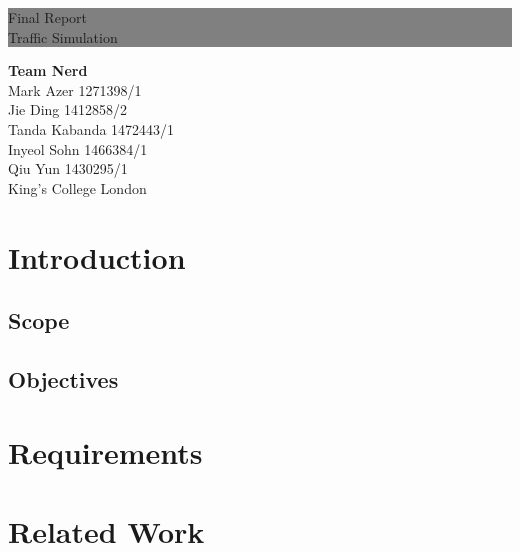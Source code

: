 \documentclass[11pt]{article}
\begin{document}
	\thispagestyle{empty} %

	\colorbox{grey}{
		\parbox[t]{1.0\linewidth}{
			\centering \fontsize{180pt}{40pt}\selectfont %
			\vspace*{0.3cm} %
			
			\hfill Final Report \\
			\hfill Traffic Simulation\par
			
			\vspace*{0.7cm} %
		}
	}
	\vfill %
	{\centering \large 
		\hfill \textbf{Team Nerd} \\
		\hfill Mark Azer 1271398/1\\
		\hfill Jie Ding 1412858/2 \\
		\hfill Tanda Kabanda 1472443/1 \\
		\hfill Inyeol Sohn 1466384/1 \\
		\hfill Qiu Yun 1430295/1 \\
		\hfill King's College London \\
	}
	\clearpage %
	\tableofcontents
	
	\section{Introduction} %
	\subsection{Scope}
	\subsection{Objectives}
	\section{Requirements} %
	\section{Related Work} %
\end{document}
